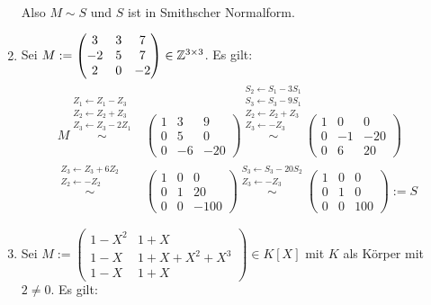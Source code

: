 \documentclass[../../main.tex]{subfiles}
\begin{document}
\begin{bsp}
\begin{enumerate}[\normalfont(a)]
\begin{align*}
\end{align*}
Also $M\sim S$ und $S$ ist in Smithscher Normalform.
\item Sei $M:=\begin{pmatrix*}3 & 3 & 7\\ -2 & 5 & 7\\ 2 & 0 & -2\end{pmatrix*}\in \Z^{3\times 3}$. Es gilt:
\begin{align*}
M\stackrel{\begin{smallmatrix*}Z_1\leftarrow Z_1-Z_3\\Z_2\leftarrow Z_2+Z_3\\ Z_3\leftarrow Z_3-2Z_1\end{smallmatrix*}}{\sim}&\begin{pmatrix*}1 & 3 & 9\\ 0 & 5 & 0\\ 0 & -6 & -20\end{pmatrix*}\stackrel{\begin{smallmatrix*}S_2\leftarrow S_1-3S_1\\S_3\leftarrow S_3-9S_1\\ Z_2\leftarrow Z_2+Z_3\\ Z_3\leftarrow -Z_3\end{smallmatrix*}}{\sim}\begin{pmatrix*}1 & 0 & 0\\ 0 & -1 & -20\\ 0 & 6 & 20\end{pmatrix*}\\
\stackrel{\begin{smallmatrix*}Z_3\leftarrow Z_3+6Z_2\\ Z_2\leftarrow -Z_2\end{smallmatrix*}}{\sim}&\begin{pmatrix*}1 & 0 & 0\\ 0 & 1 & 20\\ 0 & 0 & -100\end{pmatrix*}\stackrel{\begin{smallmatrix*}S_3\leftarrow S_3-20S_2\\ Z_3\leftarrow -Z_3\end{smallmatrix*}}{\sim}\begin{pmatrix*}1 & 0 & 0\\ 0 & 1 & 0\\ 0 & 0 & 100\end{pmatrix*}:=S
\end{align*}
\item Sei $M:=\begin{pmatrix}1-X^2 & 1+X\\ 1-X & 1+X+X^2+X^3\\ 1-X & 1+X\end{pmatrix}\in K[X]$ mit $K$ als Körper mit $2\neq 0$. Es gilt:

\end{enumerate}
\end{bsp}
\end{document}
